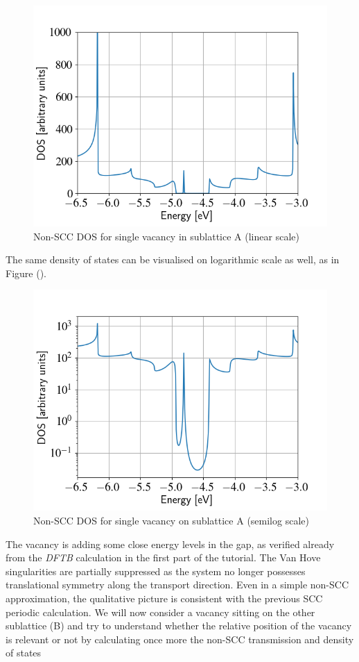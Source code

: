 \documentclass[a4paper,11pt,english]{sphinxmanual}
\begin{document}
{{\begin{figure}[htbp]
\includegraphics[width=0.700\linewidth]{nonscc-vac-dos.png}
\caption{Non-SCC DOS for single vacancy in sublattice A (linear scale)}\label{transport:fig-nonscc-vac-dos}\end{figure}

The same density of states can be visualised on logarithmic scale as
well, as in Figure {\hyperref[transport:fig-nonscc-vac-semilog-dos]{\emph{}}} ().
\begin{figure}[htbp]
\centering
\capstart
\includegraphics[width=0.700\linewidth]{nonscc-vac-semilog-dos.png}
\caption{Non-SCC DOS for single vacancy on sublattice A (semilog scale)}\label{transport:fig-nonscc-vac-semilog-dos}\end{figure}

The vacancy is adding some close energy levels in the gap, as verified
already from the \emph{DFTB} calculation in the first part of the
tutorial. The Van Hove singularities are partially suppressed as the
system no longer possesses translational symmetry along the transport
direction. Even in a simple non-SCC approximation, the qualitative
picture is consistent with the previous SCC periodic calculation. We
will now consider a vacancy sitting on the other sublattice (B) and
try to understand whether the relative position of the vacancy is
relevant or not by calculating once more the non-SCC transmission and
density of states

}}
\end{document}
